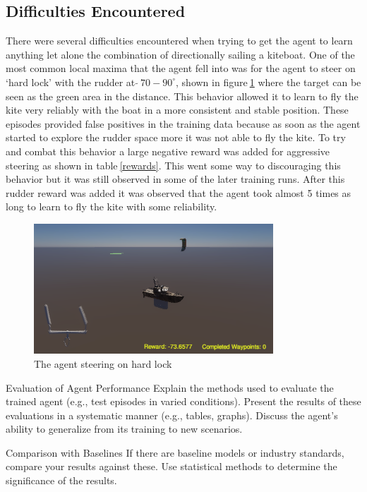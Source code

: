 \subsection*{Difficulties Encountered}
There were several difficulties encountered when trying to get the agent to learn anything let alone the combination of directionally sailing a kiteboat. One of the most common local maxima that the agent fell into was for the agent to steer on `hard lock' with the rudder at \textit{$\tilde{} ~70-90^{\circ}$}, shown in figure$~$\ref{hard_lock} where the target can be seen as the green area in the distance. This behavior allowed it to learn to fly the kite very reliably with the boat in a more consistent and stable position. These episodes provided false positives in the training data because as soon as the agent started to explore the rudder space more it was not able to fly the kite. To try and combat this behavior a large negative reward was added for aggressive steering as shown in table$~$\ref{rewards}. This went some way to discouraging this behavior but it was still observed in some of the later training runs. After this rudder reward was added it was observed that the agent took almost 5 times as long to learn to fly the kite with some reliability. 

\begin{figure}[!htb]
    \centering
    \includegraphics[width=0.8\textwidth]{Images/hard_lock.png}
    \caption{The agent steering on hard lock}\label{hard_lock}
\end{figure}


Evaluation of Agent Performance
Explain the methods used to evaluate the trained agent (e.g., test episodes in varied conditions).
Present the results of these evaluations in a systematic manner (e.g., tables, graphs).
Discuss the agent’s ability to generalize from its training to new scenarios.

Comparison with Baselines
If there are baseline models or industry standards, compare your results against these.
Use statistical methods to determine the significance of the results.

